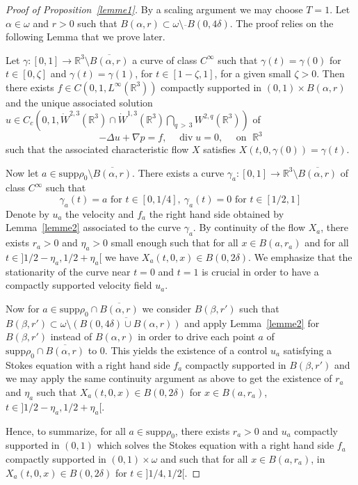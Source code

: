 \documentclass[AHL,Unicode,longabstracts,published]{cedram}
\newcommand{\supp}{\mathrm{supp} }
\newcommand{\R}{\mathbb{R}}
\renewcommand{\div}{\operatorname{div}}
\begin{document}
\begin{proof}[Proof of Proposition~\ref{lemme1}]
By a scaling argument we may choose $T=1$. Let $\alpha \in \omega $ and $r>0$ such that $B(\alpha,r)\subset \omega \setminus \overline{}{B(0,4 \delta)}$. The proof relies on the following Lemma that we prove later.

\begin{lemm}\label{lemme2}
Let $ \gamma : [0,1] \to \R^3\setminus \overline{B(\alpha,r)}$ a curve of class $C^\infty$ such that $\gamma(t)=\gamma(0)$ for $t \in [0,\zeta]$ and $\gamma(t)=\gamma(1)$, for $ t \in [1-\zeta,1]$, for a given small $\zeta>0$. Then there exists $f\in C(0,1,L^\infty(\R^3))$ compactly supported in $(0,1)\times B(\alpha,r)$ and the unique associated solution $u\in C_c(0,1,\dot{W}^{2,3}(\R^3)\cap \dot{W}^{1,3}(\R^3)\bigcap_{q\,>\,3}W^{2,q}(\R^3))$ of
\[
-\Delta u +\nabla p = f,\quad \div u =0,\quad \text{ on }\; \R^3
\]
such that the associated characteristic flow $X$ satisfies $X(t,0,\gamma(0))=\gamma(t)$.
\end{lemm}


Now let $a \in \supp \rho_0 \setminus \overline{B(\alpha,r)}$.
There exists a curve $\gamma_a:[0,1] \to \R^3 \setminus \overline{B(\alpha,r)}$ of class $C^\infty$ such that
\[
\gamma_a(t)=a \text{ for } t\in[0,1/4], \: \gamma_a(t)=0 \text{ for }t\in[1/2, 1]
\]
Denote by $u_a$ the velocity and $f_a$ the right hand side obtained by Lemma~\ref{lemme2} associated to the curve $\gamma_a$. By continuity of the flow $X_a$, there exists $r_a>0$ and $\eta_a>0$ small enough such that for all $x \in B(a,r_a)$ and for all $t \in]1/2-\eta_a,1/2+\eta_a[$ we have $X_a(t,0,x)\in B(0,2\delta)$. We emphasize that the stationarity of the curve near $t=0$ and $t=1$ is crucial in order to have a compactly supported velocity field $u_a$.

Now for $ a \in \supp \rho_0\cap \overline{B(\alpha,r)} $ we consider $B(\beta,r')$ such that $B(\beta,r') \subset \omega \setminus \overline{(B(0,4\delta)\cup B(\alpha,r))}$ and apply Lemma~\ref{lemme2} for $B(\beta,r')$ instead of $B(\alpha,r)$ in order to drive each point $a$ of $\supp \rho_0\cap \overline{B(\alpha,r)}$ to $0$. This yields the existence of a control $u_a$ satisfying a Stokes equation with a right hand side $f_a$ compactly supported in $B(\beta,r')$ and we may apply the same continuity argument as above to get the existence of $r_a$ and $\eta_a$ such that $X_a(t,0,x)\in B(0,2\delta)$ for $x\in B(a,r_a)$, $t\in]1/2-\eta_a,1/2+\eta_a[$.

Hence, to summarize, for all $a\in \supp \rho_0 $, there exists $r_a>0$ and $u_a$ compactly supported in $(0,1)$ which solves the Stokes equation with a right hand side $f_a$ compactly supported in $(0,1)\times \omega$ and such that for all $x \in B(a,r_a)$, in $X_a(t,0,x) \in B(0,2\delta)$ for $t\in]1/4,1/2[$.



\end{proof}
\end{document}
